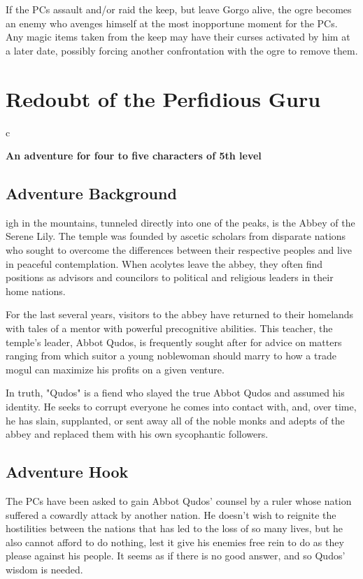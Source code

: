 \documentclass[10pt,a4paper,twoside,bg=print,twocolumn,openany,nodeprecatedcode]{dndbook}
\begin{document}
If the PCs assault and/or raid the keep, but leave Gorgo alive, the ogre becomes an enemy who avenges himself at the most inopportune moment for the PCs. Any magic items taken from the keep may have their curses activated by him at a later date, possibly forcing another confrontation with the ogre to remove them.

\chapter{Redoubt of the Perfidious Guru}

\begin{DndTable}{c}

\textbf{An adventure for four to five characters of 5th level}\\
\end{DndTable}

\section{Adventure Background}
igh in the mountains, tunneled directly into one of the peaks, is the Abbey of the Serene Lily. The temple was founded by ascetic scholars from disparate nations who sought to overcome the differences between their respective peoples and live in peaceful contemplation. When acolytes leave the abbey, they often find positions as advisors and councilors to political and religious leaders in their home nations.


For the last several years, visitors to the abbey have returned to their homelands with tales of a mentor with powerful precognitive abilities. This teacher, the temple's leader, Abbot Qudos, is frequently sought after for advice on matters ranging from which suitor a young noblewoman should marry to how a trade mogul can maximize his profits on a given venture.

In truth, "Qudos" is a fiend who slayed the true Abbot Qudos and assumed his identity. He seeks to corrupt everyone he comes into contact with, and, over time, he has slain, supplanted, or sent away all of the noble monks and adepts of the abbey and replaced them with his own sycophantic followers.

\section{Adventure Hook}
The PCs have been asked to gain Abbot Qudos' counsel by a ruler whose nation suffered a cowardly attack by another nation. He doesn't wish to reignite the hostilities between the nations that has led to the loss of so many lives, but he also cannot afford to do nothing, lest it give his enemies free rein to do as they please against his people. It seems as if there is no good answer, and so Qudos' wisdom is needed.
\end{document}
